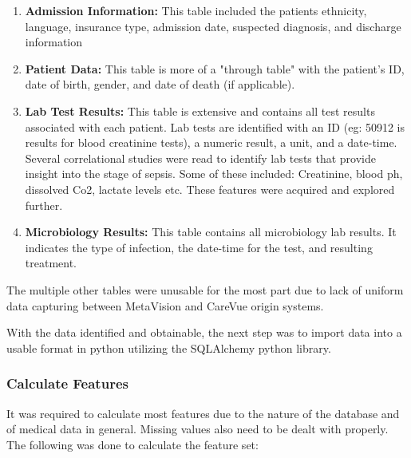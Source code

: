 \documentclass[11pt]{article}
\begin{document}
		\begin{enumerate}
			\item \textbf{Admission Information:} This table included the patients ethnicity, language, insurance type, admission date, suspected diagnosis, and discharge information
			
			\item \textbf{Patient Data:} This table is more of a "through table" with the patient's ID, date of birth, gender, and date of death (if applicable).
			
			\item \textbf{Lab Test Results:} This table is extensive and contains all test results associated with each patient. Lab tests are identified with an ID (eg: 50912 is results for blood creatinine tests), a numeric result, a unit, and a date-time. Several correlational studies were read to identify lab tests that provide insight into the stage of sepsis. Some of these included: Creatinine, blood ph, dissolved Co2, lactate levels etc. These features were acquired and explored further. 
			
			\item \textbf{Microbiology Results:} This table contains all microbiology lab results. It indicates the type of infection, the date-time for the test, and resulting treatment.
			
		\end{enumerate}
	
		The multiple other tables were unusable for the most part due to lack of uniform data capturing between MetaVision and CareVue origin systems. 
		
		With the data identified and obtainable, the next step was to import data into a usable format in python utilizing the SQLAlchemy python library.

		\subsubsection{Calculate Features}
		It was required to calculate most features due to the nature of the database and of medical data in general. Missing values also need to be dealt with properly. The following was done to calculate the feature set:
		
\end{document}
